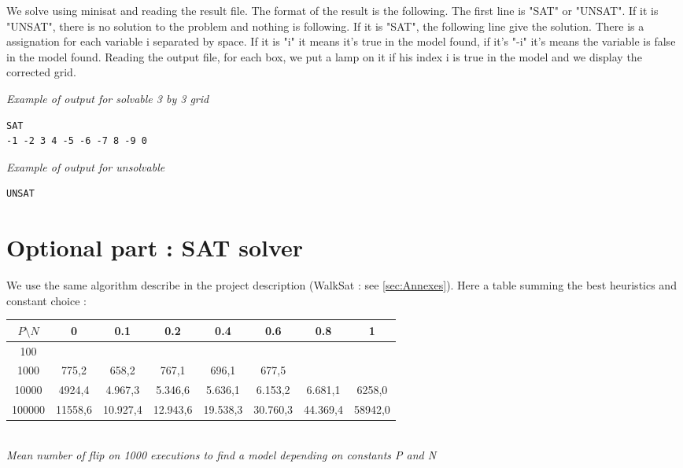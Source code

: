 \documentclass[a4paper]{article}
\begin{document}
We solve using minisat and reading the result file. The format of the result is the following.
The first line is "SAT" or "UNSAT".
If it is "UNSAT", there is no solution to the problem and nothing is following.
If it is "SAT", the following line give the solution. There is a assignation for each variable i separated by space. If it is "i" it means it's true in the model found, if it's "-i" it's means the variable is false in the model found.
Reading the output file, for each box, we put a lamp on it if his index i is true in the model and we display the corrected grid.\newline

\newpage

\textit{Example of output for solvable 3 by 3 grid}
\begin{verbatim}
SAT
-1 -2 3 4 -5 -6 -7 8 -9 0

\end{verbatim}

\textit{Example of output for unsolvable}
\begin{verbatim}
UNSAT

\end{verbatim}

\section{Optional part : SAT solver}

We use the same algorithm describe in the project description (WalkSat : see \ref{sec:Annexes}). Here a table summing the best heuristics and constant choice :
\begin{table}[h!]
\begin{center}
	\begin{tabular}{c||c c c c c c c}
         	$P \setminus N$ & 0  & 0.1  & 0.2  & 0.4  & 0.6 & 0.8 & 1  \\
        	\hline
        	\hline
     	    100 &  \cellcolor[gray]{0.5}   &   \cellcolor[gray]{0.5}   &     \cellcolor[gray]{0.5} &   \cellcolor[gray]{0.5}   &  \cellcolor[gray]{0.5}   & \cellcolor[gray]{0.5} &  \cellcolor[gray]{0.5} \\
     	   1000 & 775,2  & 658,2  & 767,1  & 696,1  & 677,5 & \cellcolor[gray]{0.5} &  \cellcolor[gray]{0.5} \\
    	  10000 & 4924,4  &  4.967,3  & 5.346,6 & 5.636,1   & 6.153,2 & 6.681,1 & 6258,0  \\
    	 100000 & 11558,6 & 10.927,4 & 12.943,6 & 19.538,3  & 30.760,3 &    44.369,4 & 58942,0  \\
      	\end{tabular}\\
      	\textit{Mean number of flip on 1000 executions to find a model depending on constants P and N}
\end{center}	
\end{table}
      	
\end{document}
